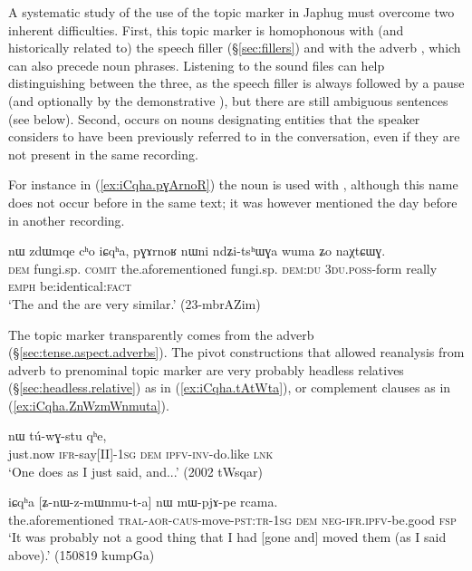 A systematic study of the use of the topic marker  in Japhug must overcome two inherent difficulties. First, this topic marker is homophonous with (and historically related to) the speech filler  (§\ref{sec:fillers}) and with the adverb , which can also precede noun phrases. Listening to the sound files can help distinguishing between the three, as the speech filler is always followed by a pause (and optionally by the demonstrative ), but there are still ambiguous sentences (see below). Second,  occurs on nouns designating entities that the speaker considers to have been previously referred to in the conversation, even if they are not present in the same recording. 

For instance in (\ref{ex:iCqha.pɣArnoR}) the noun  is used with , although this name does not occur before in the same text; it was however mentioned the day before in another recording.

\begin{exe}
\ex \label{ex:iCqha.pɣArnoR}
\gll nɯ zdɯmqe cʰo iɕqʰa, pɣɤrnoʁ nɯni ndʑi-tsʰɯɣa wuma ʑo naχtɕɯɣ. \\
\textsc{dem} fungi.sp. \textsc{comit} the.aforementioned fungi.sp. \textsc{dem}:\textsc{du} \textsc{3du}.\textsc{poss}-form really \textsc{emph} be:identical:\textsc{fact} \\
\glt `The  and the  are very similar.' (23-mbrAZim)
\end{exe}

 
The topic marker  transparently comes from the adverb  (§\ref{sec:tense.aspect.adverbs}). The pivot constructions that allowed reanalysis from adverb to prenominal topic marker are very probably headless relatives (§\ref{sec:headless.relative}) as in  (\ref{ex:iCqha.tAtWta}), or complement clauses as in (\ref{ex:iCqha.ZnWzmWnmuta}). 

\begin{exe}
\ex \label{ex:iCqha.tAtWta}
  nɯ tú-wɣ-stu qʰe, \\
 just.now \textsc{ifr}-say[II]-\textsc{1sg} \textsc{dem} \textsc{ipfv}-\textsc{inv}-do.like \textsc{lnk} \\
\glt `One does as I just said, and...' (2002 tWsqar)
\end{exe}

\begin{exe}
\ex \label{ex:iCqha.ZnWzmWnmuta}
 \gll iɕqʰa [ʑ-nɯ-z-mɯnmu-t-a] nɯ mɯ-pjɤ-pe rcama.  \\
the.aforementioned  \textsc{tral}-\textsc{aor}-\textsc{caus}-move-\textsc{pst}:\textsc{tr}-\textsc{1sg} \textsc{dem} \textsc{neg}-\textsc{ifr}.\textsc{ipfv}-be.good \textsc{fsp} \\
\glt `It was probably not a good thing that I had [gone and] moved them (as I said above).' (150819 kumpGa) 
 \end{exe}
 

